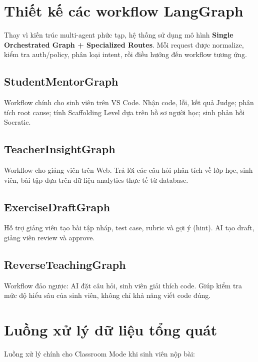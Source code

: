 \section{Thiết kế các workflow LangGraph}

Thay vì kiến trúc multi-agent phức tạp, hệ thống sử dụng mô hình \textbf{Single Orchestrated Graph + Specialized Routes}. Mỗi request được normalize, kiểm tra auth/policy, phân loại intent, rồi điều hướng đến workflow tương ứng.

\subsection{StudentMentorGraph}

Workflow chính cho sinh viên trên VS Code. Nhận code, lỗi, kết quả Judge; phân tích root cause; tính Scaffolding Level dựa trên hồ sơ người học; sinh phản hồi Socratic.

\subsection{TeacherInsightGraph}

Workflow cho giảng viên trên Web. Trả lời các câu hỏi phân tích về lớp học, sinh viên, bài tập dựa trên dữ liệu analytics thực tế từ database.

\subsection{ExerciseDraftGraph}

Hỗ trợ giảng viên tạo bài tập nháp, test case, rubric và gợi ý (hint). AI tạo draft, giảng viên review và approve.

\subsection{ReverseTeachingGraph}

Workflow đảo ngược: AI đặt câu hỏi, sinh viên giải thích code. Giúp kiểm tra mức độ hiểu sâu của sinh viên, không chỉ khả năng viết code đúng.

\section{Luồng xử lý dữ liệu tổng quát}


Luồng xử lý chính cho Classroom Mode khi sinh viên nộp bài:

